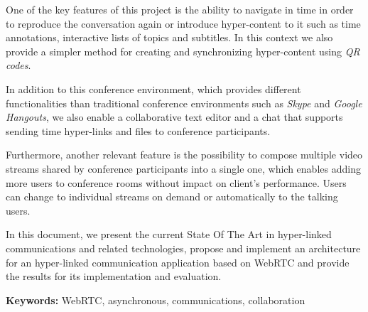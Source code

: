 {\color{red}One of the key features of this project is the ability to navigate in time in order to reproduce the conversation again or introduce hyper-content to it such as time annotations, interactive lists of topics and subtitles. In this context we also provide a simpler method for creating and synchronizing hyper-content using \emph{QR codes}.}

{\color{red}In addition to this conference environment, which provides different functionalities than traditional conference environments such as \emph{Skype} and \emph{Google Hangouts}, we also enable a collaborative text editor and a chat that supports sending time hyper-links and files to conference participants.}

{\color{red}Furthermore, another relevant feature is the possibility to compose multiple video streams shared by conference participants into a single one, which enables adding more users to conference rooms without impact on client's performance. Users can change to individual streams on demand or automatically to the talking users.}



{\color{blue}
In this document, we present the current State Of The Art in hyper-linked communications and related technologies, propose and implement an architecture for an hyper-linked communication application based on \ac{WebRTC} and provide the results for its implementation and evaluation.
}


\vspace{1cm}

\textbf{\Large Keywords:} WebRTC, asynchronous, communications, collaboration


\cleardoublepage

